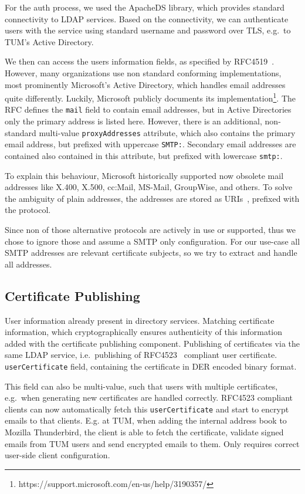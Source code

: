 For the auth process, we used the ApacheDS library, which provides standard connectivity to LDAP services.
Based on the connectivity, we can authenticate users with the service using standard username and password over TLS,
e.g.\ to TUM's Active Directory.

We then can access the users information fields, as specified by RFC4519~\cite{RFC4519}.
However, many organizations use non standard conforming implementations, most prominently Microsoft's Active Directory,
which handles email addresses quite differently.
Luckily, Microsoft publicly documents its implementation\footnote{https://support.microsoft.com/en-us/help/3190357/}.
The RFC defines the \lstinline{mail} field to contain email addresses, but in Active Directories only the primary
address is listed here.
However, there is an additional, non-standard multi-value \lstinline{proxyAddresses} attribute, which also contains the
primary email address, but prefixed with uppercase \lstinline{SMTP:}.
Secondary email addresses are contained also contained in this attribute, but prefixed with lowercase \lstinline{smtp:}.

To explain this behaviour, Microsoft historically supported now obsolete mail addresses like X.400, X.500, cc:Mail,
MS-Mail, GroupWise, and others.
To solve the ambiguity of plain addresses, the addresses are stored as URIs~\cite{RFC3986}, prefixed with the protocol.

Since non of those alternative protocols are actively in use or supported, thus we chose to ignore those and assume a
SMTP only configuration.
For our use-case all SMTP addresses are relevant certificate subjects, so we try to extract and handle all addresses.

\subsection*{Certificate Publishing}
User information already present in directory services.
Matching certificate information, which cryptographically ensures authenticity of this information added with the
certificate publishing component.
Publishing of certificates via the same LDAP service, i.e.\ publishing of RFC4523~\cite{RFC4523} compliant user
certificate.
\lstinline{userCertificate} field, containing the certificate in DER encoded binary format.

This field can also be multi-value, such that users with multiple certificates, e.g.\ when generating new certificates
are handled correctly.
RFC4523 compliant clients can now automatically fetch this \lstinline{userCertificate} and start to encrypt emails to
that clients.
E.g. at TUM, when adding the internal address book to Mozilla Thunderbird, the client is able to fetch the certificate,
validate signed emails from TUM users and send encrypted emails to them.
Only requires correct user-side client configuration.

